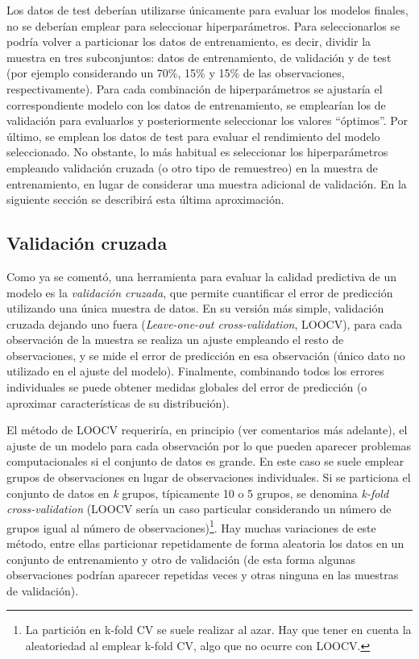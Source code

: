 \documentclass[
]{book}
\theoremstyle{break}
\theoremstyle{nonumberplain}
\begin{document}
Los datos de test deberían utilizarse únicamente para evaluar los modelos finales, no se deberían emplear para seleccionar hiperparámetros.
Para seleccionarlos se podría volver a particionar los datos de entrenamiento, es decir, dividir la muestra en tres subconjuntos: datos de entrenamiento, de validación y de test (por ejemplo considerando un 70\%, 15\% y 15\% de las observaciones, respectivamente).
Para cada combinación de hiperparámetros se ajustaría el correspondiente modelo con los datos de entrenamiento, se emplearían los de validación para evaluarlos y posteriormente seleccionar los valores ``óptimos''.
Por último, se emplean los datos de test para evaluar el rendimiento del modelo seleccionado.
No obstante, lo más habitual es seleccionar los hiperparámetros empleando validación cruzada (o otro tipo de remuestreo) en la muestra de entrenamiento, en lugar de considerar una muestra adicional de validación.
En la siguiente sección se describirá esta última aproximación.

\hypertarget{cv}{%
\subsection{Validación cruzada}\label{cv}}

Como ya se comentó, una herramienta para evaluar la calidad predictiva de un modelo es la \emph{validación cruzada}, que permite cuantificar el error de predicción utilizando una única muestra de datos.
En su versión más simple, validación cruzada dejando uno fuera (\emph{Leave-one-out cross-validation}, LOOCV), para cada observación de la muestra se realiza un ajuste empleando el resto de observaciones, y se mide el error de predicción en esa observación (único dato no utilizado en el ajuste del modelo).
Finalmente, combinando todos los errores individuales se puede obtener medidas globales del error de predicción (o aproximar características de su distribución).

El método de LOOCV requeriría, en principio (ver comentarios más adelante), el ajuste de un modelo para cada observación por lo que pueden aparecer problemas computacionales si el conjunto de datos es grande.
En este caso se suele emplear grupos de observaciones en lugar de observaciones individuales.
Si se particiona el conjunto de datos en \emph{k} grupos, típicamente 10 o 5 grupos, se denomina \emph{k-fold cross-validation} (LOOCV sería un caso particular considerando un número de grupos igual al número de observaciones)\footnote{La partición en k-fold CV se suele realizar al azar. Hay que tener en cuenta la aleatoriedad al emplear k-fold CV, algo que no ocurre con LOOCV.}.
Hay muchas variaciones de este método, entre ellas particionar repetidamente de forma aleatoria los datos en un conjunto de entrenamiento y otro de validación (de esta forma algunas observaciones podrían aparecer repetidas veces y otras ninguna en las muestras de validación).
\end{document}

